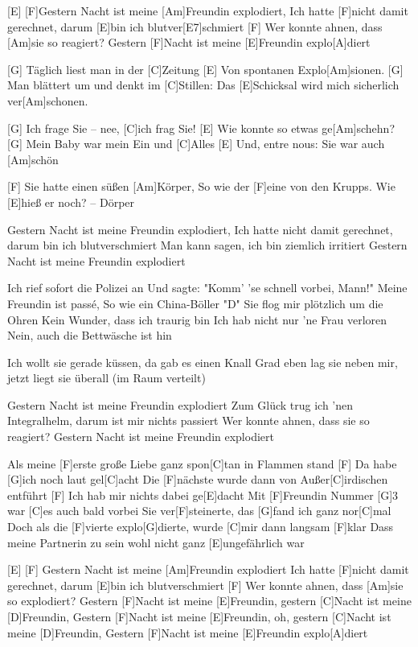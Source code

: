 

\begin{guitar}
	[E] [F]Gestern Nacht ist meine [Am]Freundin explodiert,
	Ich hatte [F]nicht damit gerechnet, darum [E]bin ich blutver[E7]schmiert
	[F] Wer konnte ahnen, dass [Am]sie so reagiert?
	Gestern [F]Nacht ist meine [E]Freundin explo[A]diert
	
	[G] Täglich liest man in der [C]Zeitung 
	[E] Von spontanen Explo[Am]sionen. 
	[G] Man blättert um und denkt im [C]Stillen: 
	Das [E]Schicksal wird mich sicherlich ver[Am]schonen.
	
	[G] Ich frage Sie – nee, [C]ich frag Sie!
	[E] Wie konnte so etwas ge[Am]schehn?
	[G] Mein Baby war mein Ein und [C]Alles 
	[E] Und, entre nous: Sie war auch [Am]schön
	
	[F] Sie hatte einen süßen [Am]Körper,
	So wie der [F]eine von den Krupps. Wie [E]hieß er noch? – Dörper
	
	Gestern Nacht ist meine Freundin explodiert,
	Ich hatte nicht damit gerechnet, darum bin ich blutverschmiert
	Man kann sagen, ich bin ziemlich irritiert
	Gestern Nacht ist meine Freundin explodiert
	
	Ich rief sofort die Polizei an
	Und sagte: "Komm' 'se schnell vorbei, Mann!"
	Meine Freundin ist passé,
	So wie ein China-Böller "D"
	\pagebreak
	Sie flog mir plötzlich um die Ohren
	Kein Wunder, dass ich traurig bin
	Ich hab nicht nur ’ne Frau verloren
	Nein, auch die Bettwäsche ist hin
	
	Ich wollt sie gerade küssen, da gab es einen Knall
	Grad eben lag sie neben mir, jetzt liegt sie überall (im Raum verteilt)
	
	Gestern Nacht ist meine Freundin explodiert
	Zum Glück trug ich ’nen Integralhelm, darum ist mir nichts passiert
	Wer konnte ahnen, dass sie so reagiert?
	Gestern Nacht ist meine Freundin explodiert
	
	Als meine [F]erste große Liebe ganz spon[C]tan in Flammen stand
	[F] Da habe [G]ich noch laut gel[C]acht
	Die [F]nächste wurde dann von Außer[C]irdischen entführt
	[F] Ich hab mir nichts dabei ge[E]dacht
	Mit [F]Freundin Nummer [G]3 war [C]es auch bald vorbei
	Sie ver[F]steinerte, das [G]fand ich ganz nor[C]mal
	Doch als die [F]vierte explo[G]dierte, wurde [C]mir dann langsam [F]klar
	Dass meine Partnerin zu sein wohl nicht ganz [E]ungefährlich war
	
	[E] [F] Gestern Nacht ist meine [Am]Freundin explodiert
	Ich hatte [F]nicht damit gerechnet, darum [E]bin ich blutverschmiert
	[F] Wer konnte ahnen, dass [Am]sie so explodiert?
	Gestern [F]Nacht ist meine [E]Freundin, gestern [C]Nacht ist meine [D]Freundin, 
	Gestern [F]Nacht ist meine [E]Freundin, oh, gestern [C]Nacht ist meine [D]Freundin,
	Gestern [F]Nacht ist meine [E]Freundin explo[A]diert
\end{guitar}